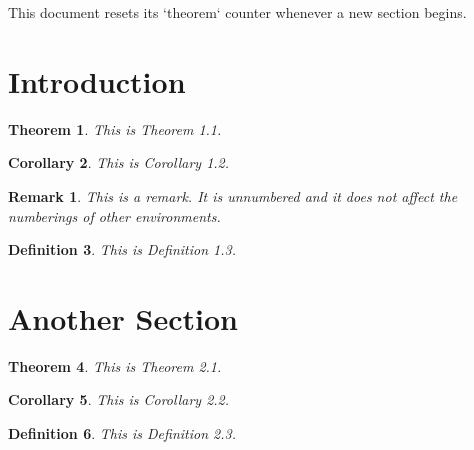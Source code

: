 \documentclass{article}
\newtheorem{theorem}{Theorem}
\newtheorem{corollary}[theorem]{Corollary}
\newtheorem{definition}[theorem]{Definition}
\newtheorem*{remark*}{Remark}
\numberwithin{theorem}{section}
\begin{document}
This document resets its `theorem` counter whenever a new section begins.

\section{Introduction}

\begin{theorem}
This is Theorem 1.1.
\end{theorem}

\begin{corollary}
This is Corollary 1.2.
\end{corollary}

\begin{remark*}
This is a remark. It is unnumbered and it does not affect the numberings of other environments.
\end{remark*}


\begin{definition}
This is Definition 1.3.
\end{definition}



\section{Another Section}

\begin{theorem}
This is Theorem 2.1.
\end{theorem}

\begin{corollary}
This is Corollary 2.2.
\end{corollary}

\begin{definition}
This is Definition 2.3.
\end{definition}
\end{document}
